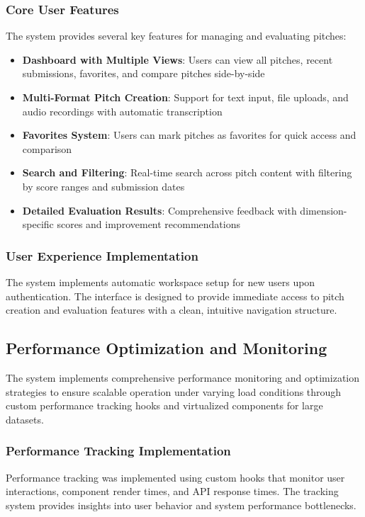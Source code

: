 \subsubsection{Core User Features}
The system provides several key features for managing and evaluating pitches:

\begin{itemize}
  \item \textbf{Dashboard with Multiple Views}: Users can view all pitches, recent submissions, favorites, and compare pitches side-by-side
  \item \textbf{Multi-Format Pitch Creation}: Support for text input, file uploads, and audio recordings with automatic transcription
  \item \textbf{Favorites System}: Users can mark pitches as favorites for quick access and comparison
  \item \textbf{Search and Filtering}: Real-time search across pitch content with filtering by score ranges and submission dates
  \item \textbf{Detailed Evaluation Results}: Comprehensive feedback with dimension-specific scores and improvement recommendations
\end{itemize}

\subsubsection{User Experience Implementation}
The system implements automatic workspace setup for new users upon authentication. The interface is designed to provide immediate access to pitch creation and evaluation features with a clean, intuitive navigation structure.


\subsection{Performance Optimization and Monitoring}
The system implements comprehensive performance monitoring and optimization strategies to ensure scalable operation under varying load conditions through custom performance tracking hooks and virtualized components for large datasets.


\subsubsection{Performance Tracking Implementation}
Performance tracking was implemented using custom hooks that monitor user interactions, component render times, and API response times. The tracking system provides insights into user behavior and system performance bottlenecks.

